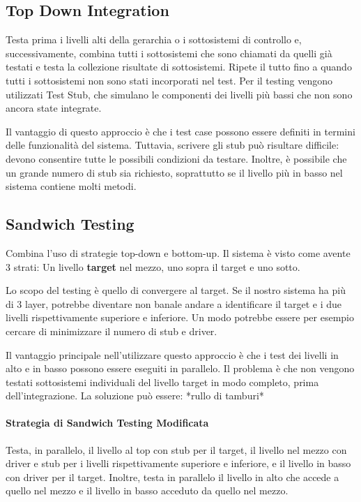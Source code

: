         \subsection{Top Down Integration}
            Testa prima i livelli alti della gerarchia o i sottosistemi di controllo e, successivamente, combina tutti i sottosistemi che sono chiamati da quelli già testati e testa la collezione risultate di sottosistemi. Ripete il tutto fino a quando tutti i sottosistemi non sono stati incorporati nel test. Per il testing vengono utilizzati Test Stub, che simulano le componenti dei livelli più bassi che non sono ancora state integrate.
            
            Il vantaggio di questo approccio è che i test case possono essere definiti in termini delle funzionalità del sistema. Tuttavia, scrivere gli stub può risultare difficile: devono consentire tutte le possibili condizioni da testare. Inoltre, è possibile che un grande numero di stub sia richiesto, soprattutto se il livello più in basso nel sistema contiene molti metodi.
        
        \subsection{Sandwich Testing}
            Combina l'uso di strategie top-down e bottom-up. Il sistema è visto come avente 3 strati: Un livello \textbf{target} nel mezzo, uno sopra il target e uno sotto.
            
            Lo scopo del testing è quello di convergere al target. Se il nostro sistema ha più di 3 layer, potrebbe diventare non banale andare a identificare il target e i due livelli rispettivamente superiore e inferiore. Un modo potrebbe essere per esempio cercare di minimizzare il numero di stub e driver.
            
            Il vantaggio principale nell'utilizzare questo approccio è che i test dei livelli in alto e in basso possono essere eseguiti in parallelo. Il problema è che non vengono testati sottosistemi individuali del livello target in modo completo, prima dell'integrazione. La soluzione può essere: *rullo di tamburi*
            
            \paragraph{Strategia di Sandwich Testing Modificata}
                Testa, in parallelo, il livello al top con stub per il target, il livello nel mezzo con driver e stub per i livelli rispettivamente superiore e inferiore, e il livello in basso con driver per il target. Inoltre, testa in parallelo il livello in alto che accede a quello nel mezzo e il livello in basso acceduto da quello nel mezzo.
                
